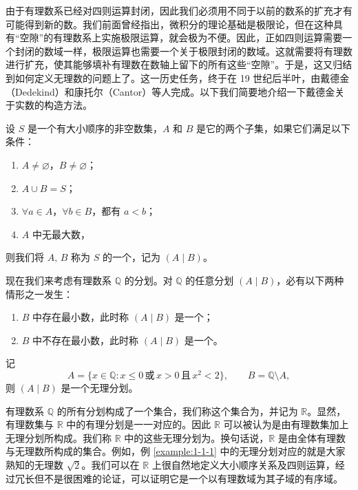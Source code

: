 \documentclass[UTF8,12pt,a4paper,fontset=fandol]{ctexbook}
\begin{document}
由于有理数系已经对四则运算封闭，因此我们必须用不同于以前的数系的扩充才有可能得到新的数。我们前面曾经指出，微积分的理论基础是极限论，但在这种具有“空隙”的有理数系上实施极限运算，就会极为不便。因此，正如四则运算需要一个封闭的数域一样，极限运算也需要一个关于极限封闭的数域。这就需要将有理数进行扩充，使其能够填补有理数在数轴上留下的所有这些“空隙”。于是，这又归结到如何定义无理数的问题上了。这一历史任务，终于在 19 世纪后半叶，由戴德金（Dedekind）和康托尔（Cantor）等人完成。以下我们简要地介绍一下戴德金关于实数的构造方法。


\begin{definition}
设 $S$ 是一个有大小顺序的非空数集，$A$ 和 $B$ 是它的两个子集，如果它们满足以下条件：
\begin{enumerate}[label=(\arabic*)]
  \item $A\ne\varnothing$，$B\ne\varnothing$；
  \item $A\cup B=S$；
  \item $\forall a\in A$，$\forall b\in B$，都有 $a<b$；
  \item $A$ 中无最大数，
\end{enumerate}
则我们将 $A,\,B$ 称为 $S$ 的一个，记为 $(A\mid B)$。
\end{definition}


现在我们来考虑有理数系 $\mathbb{Q}$ 的分划。对 $\mathbb{Q}$ 的任意分划 $(A\mid B)$，必有以下两种情形之一发生：
\begin{enumerate}[label=(\arabic*)]
  \item $B$ 中存在最小数，此时称 $(A\mid B)$ 是一个；
  \item $B$ 中不存在最小数，此时称 $(A\mid B)$ 是一个。
\end{enumerate}


\begin{example}\label{example:1-1-1}
记
\[
  A=\{x\in\mathbb{Q}:x\leqslant 0\,\text{或}\, x>0\,\text{且}\,x^2<2\},\qquad B=\mathbb{Q}\setminus A,
\]
则 $(A\mid B)$ 是一个无理分划。
\end{example}


有理数系 $\mathbb{Q}$ 的所有分划构成了一个集合，我们称这个集合为，并记为 $\mathbb{R}$。显然，有理数集与 $\mathbb{R}$ 中的有理分划是一一对应的。因此 $\mathbb{R}$ 可以被认为是由有理数集加上无理分划所构成。我们称 $\mathbb{R}$ 中的这些无理分划为。换句话说，$\mathbb{R}$ 是由全体有理数与无理数所构成的集合。例如，例 \ref{example:1-1-1} 中的无理分划对应的就是大家熟知的无理数 $\sqrt{2}$。我们可以在 $\mathbb{R}$ 上很自然地定义大小顺序关系及四则运算，经过冗长但不是很困难的论证，可以证明它是一个以有理数域为其子域的有序域。
\end{document}
